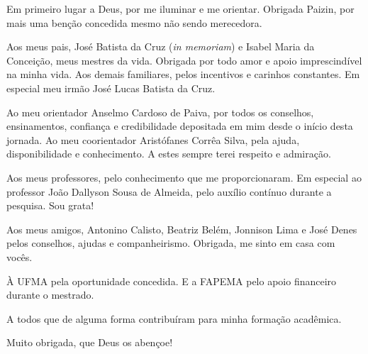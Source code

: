 \begin{agradecimentos}

Em primeiro lugar a Deus, por me iluminar e me orientar. Obrigada Paizin, por mais uma benção concedida mesmo não sendo merecedora.

Aos meus pais, José Batista da Cruz (\textit{in memoriam}) e Isabel Maria da Conceição, meus mestres da vida. Obrigada por todo amor e apoio imprescindível na minha vida. Aos demais familiares, pelos incentivos e carinhos constantes. Em especial meu irmão José Lucas Batista da Cruz.


Ao meu orientador Anselmo Cardoso de Paiva, por todos os conselhos, ensinamentos, confiança e credibilidade depositada em mim desde o início desta jornada. Ao meu coorientador Aristófanes Corrêa Silva, pela ajuda, disponibilidade e conhecimento. A estes sempre terei respeito e admiração.

Aos meus professores, pelo conhecimento que me proporcionaram. Em especial ao professor João Dallyson Sousa de Almeida, pelo auxílio contínuo durante a pesquisa. Sou grata!

Aos meus amigos, Antonino Calisto, Beatriz Belém, Jonnison Lima e José Denes pelos conselhos, ajudas e companheirismo. Obrigada, me sinto em casa com vocês.

À UFMA pela oportunidade concedida. E a FAPEMA pelo apoio financeiro durante o mestrado.

A todos que de alguma forma contribuíram para minha formação acadêmica. 

Muito obrigada, que Deus os abençoe!
 
\end{agradecimentos}
